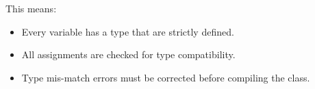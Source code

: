 


\begin{flushleft}
	
	This means:
	\begin{itemize}
		\item Every variable has a type that are strictly defined.
		\item All assignments are checked for type compatibility.
		\item Type mis-match errors must be corrected before compiling the class.
	\end{itemize}
	
	
\end{flushleft}
	




